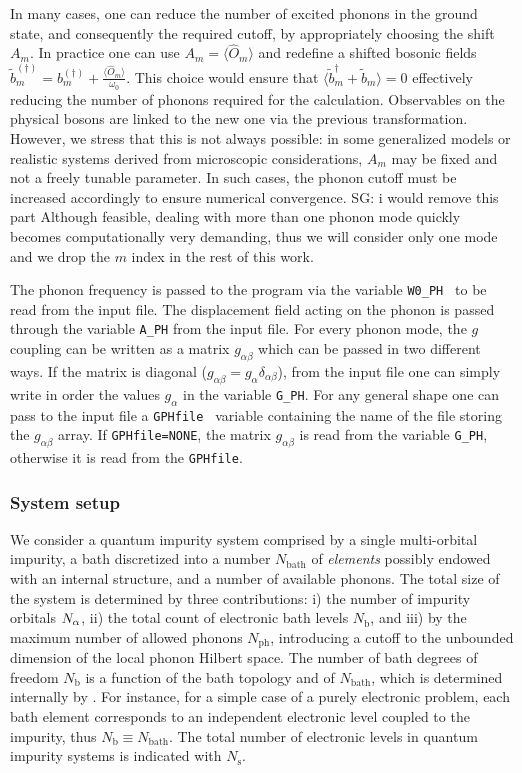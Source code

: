 \documentclass[edipack_sp.tex]{subfiles}
\begin{document}
In many cases, one can reduce the number of excited phonons in the ground state, and
consequently the required cutoff, by appropriately choosing the shift $A_m$.
In practice one can use $A_m = \langle \hat{O}_m \rangle $ and redefine a shifted bosonic fields $\tilde{b}_m^{(\dagger)} = b_m^{(\dagger)} + \frac{\langle \hat{O}_m \rangle }{\omega_0}$. This choice would ensure that $\langle \tilde{b}_m^\dagger + \tilde{b}_m \rangle =0$ effectively reducing the number of phonons required for the calculation. Observables on the physical bosons are linked to the new one via the previous transformation.
{ \color{red} However, we stress that this is not always possible: in some generalized models or realistic systems derived from microscopic considerations, $A_m$ may be fixed and not a freely tunable parameter. In such cases, the phonon cutoff must be increased accordingly to ensure numerical convergence. SG: i would remove this part}
Although feasible, dealing with more than one phonon mode quickly becomes computationally very demanding, thus we will consider only one mode and we drop the $m$ index in the rest of this work.

The phonon frequency is passed to the \NAME program via the variable { \tt W0\_PH } to be read from the input file. The displacement field acting on the phonon is passed through the variable {\tt A\_PH} from the input file. For every phonon mode, the $g$ coupling can be written as a matrix $g_{\alpha \beta}$ which can be passed in two different ways. If the matrix is diagonal ($g_{\alpha \beta} = g_\alpha \delta_{\alpha \beta}$), from the input file one can simply write in order the values $g_\alpha$ in the variable {\tt G\_PH}. For any general shape one can pass to the input file a {\tt GPHfile } variable containing the name of the file storing the $g_{\alpha \beta}$ array.
If {\tt GPHfile=NONE}, the matrix $g_{\alpha\beta}$ is read from the variable {\tt G\_PH}, otherwise it is read from the {\tt GPHfile}.

\subsubsection{System setup}
We consider a quantum impurity system comprised by a single multi-orbital impurity, a bath discretized into a number $N_\mathrm{bath}$ of {\it elements} possibly endowed with an internal structure, and a number of available phonons. 
The total size of the system is determined by three contributions: i) the number of impurity orbitals $N_\alpha$, ii) the total count of electronic bath levels $N_\mathrm{b}$, and iii) by the maximum  number of allowed phonons $N_\mathrm{ph}$, introducing a cutoff to the unbounded dimension of the local phonon Hilbert space.
The number of bath degrees of freedom $N_\mathrm{b}$ is a
function of the bath topology and of $N_\mathrm{bath}$, which is determined internally by \NAME.
For instance, for a simple case of a purely electronic problem, each bath
element corresponds to an independent electronic level coupled to the
impurity, thus $N_\mathrm{b}\equiv N_\mathrm{bath}$. 
The total number of electronic levels in quantum impurity systems is indicated with $N_\mathrm{s}$.
\end{document}
